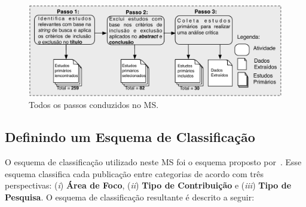 \begin{figure}[h]
 \caption{Todos os passos conduzidos no MS.}
 \label{fig:todos_os_passos}
 \centering
 \includegraphics[scale=0.7]{images/todosOsPassosMS}
 \fautor
\end{figure}

\subsection{Definindo um Esquema de Classificação}

O esquema de classificação utilizado neste MS foi o esquema proposto por~. Esse esquema classifica cada publicação entre categorias de acordo com três perspectivas: (\textit{i}) \textbf{Área de Foco}, (\textit{ii}) \textbf{Tipo de Contribuição} e (\textit{iii}) \textbf{Tipo de Pesquisa}. O esquema de classificação resultante é descrito a seguir:

